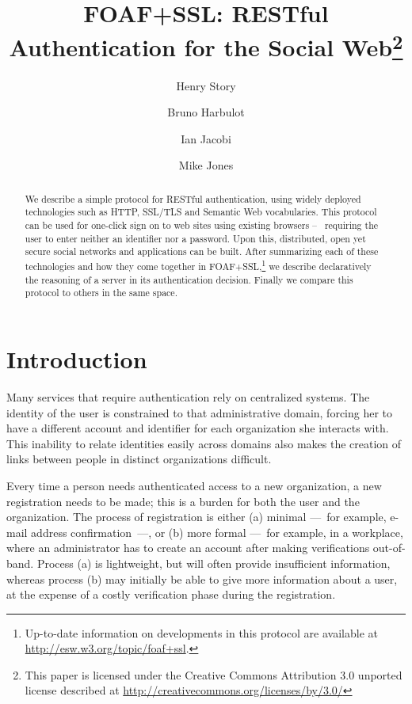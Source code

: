 \documentclass{llncs}
\begin{document}
\title{FOAF+SSL: RESTful Authentication for the Social Web\footnote{This paper is licensed under the Creative Commons Attribution 3.0 unported license described at \url{http://creativecommons.org/licenses/by/3.0/}}}
\author{Henry Story \and Bruno Harbulot \and Ian Jacobi \and Mike Jones}

\maketitle
\begin{abstract} 
 We describe a simple protocol for RESTful authentication, using
 widely deployed technologies such as HTTP, SSL/TLS and Semantic Web
 vocabularies.  This protocol can be used for one-click sign on to web sites using existing 
 browsers --~ requiring the user to enter neither an identifier nor a password.  Upon this, distributed, open yet secure social networks and applications can be built.  After summarizing each of these technologies and how
 they come together in FOAF+SSL,\footnote{Up-to-date information on
   developments in this protocol are available at
   \url{http://esw.w3.org/topic/foaf+ssl}.} we describe declaratively the
 reasoning of a server in its authentication decision. Finally we compare this protocol to 
 others in the same space.
\end{abstract}
\section{Introduction}

Many services that require authentication rely on centralized systems.
  The identity of the user is constrained
to that administrative domain, forcing her to have a different account and identifier
for each organization she interacts with. This inability to relate identities easily across
domains also makes the creation of links between people in distinct organizations 
difficult.

Every time a person needs authenticated access to a new
organization, a new registration needs to be made; this is a burden
for both the user and the organization. The process of registration is
either (a) minimal ---~for example, e-mail address confirmation~---, or
(b) more formal ---~for example, in a workplace, where an
administrator has to create an account after making verifications
out-of-band. Process (a) is lightweight, but will often provide
insufficient information, whereas process (b) may initially be able to give more
information about a user, at the expense of a costly
verification phase during the registration.
\end{document}
